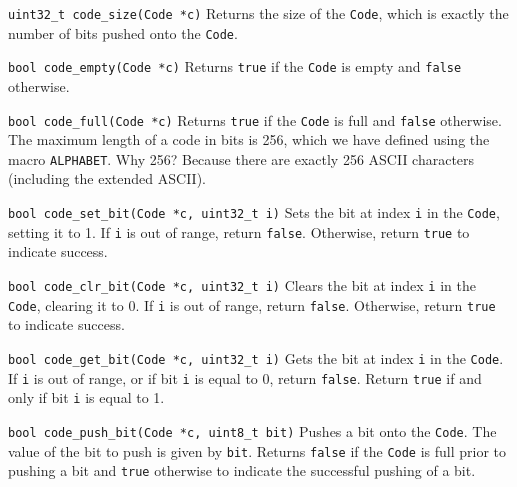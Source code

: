 \begin{funcdoc}{\texttt{uint32\_t code\_size(Code *c)}}
  Returns the size of the \texttt{Code}, which is exactly the number of
  bits pushed onto the \texttt{Code}.
\end{funcdoc}

\begin{funcdoc}{\texttt{bool code\_empty(Code *c)}}
  Returns \texttt{true} if the \texttt{Code} is empty and \texttt{false}
  otherwise.
\end{funcdoc}

\begin{funcdoc}{\texttt{bool code\_full(Code *c)}}
  Returns \texttt{true} if the \texttt{Code} is full and \texttt{false}
  otherwise. The maximum length of a code in bits is 256, which we have
  defined using the macro \texttt{ALPHABET}. Why 256? Because there are
  exactly 256 ASCII characters (including the extended ASCII).
\end{funcdoc}

\begin{funcdoc}{\texttt{bool code\_set\_bit(Code *c, uint32\_t i)}}
  Sets the bit at index \texttt{i} in the \texttt{Code}, setting it to
  1. If \texttt{i} is out of range, return \texttt{false}. Otherwise,
  return \texttt{true} to indicate success.
\end{funcdoc}

\begin{funcdoc}{\texttt{bool code\_clr\_bit(Code *c, uint32\_t i)}}
  Clears the bit at index \texttt{i} in the \texttt{Code}, clearing it
  to 0. If \texttt{i} is out of range, return \texttt{false}. Otherwise,
  return \texttt{true} to indicate success.
\end{funcdoc}

\begin{funcdoc}{\texttt{bool code\_get\_bit(Code *c, uint32\_t i)}}
  Gets the bit at index \texttt{i} in the \texttt{Code}. If \texttt{i}
  is out of range, or if bit \texttt{i} is equal to 0, return
  \texttt{false}. Return \texttt{true} if and only if bit \texttt{i} is
  equal to 1.
\end{funcdoc}

\begin{funcdoc}{\texttt{bool code\_push\_bit(Code *c, uint8\_t bit)}}
  Pushes a bit onto the \texttt{Code}. The value of the bit to push is
  given by \texttt{bit}. Returns \texttt{false} if the \texttt{Code} is
  full prior to pushing a bit and \texttt{true} otherwise to indicate
  the successful pushing of a bit.
\end{funcdoc}

